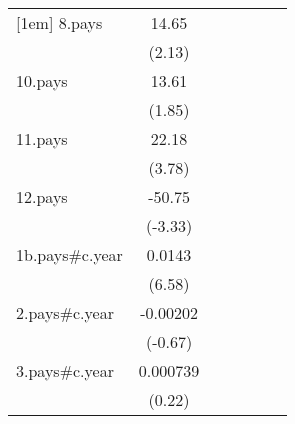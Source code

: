 {\begin{tabular}{l*{6}{c}}
[1em]
8.pays              &       14.65\sym{*}  &                     &                     &                     &                     &                     \\
                    &      (2.13)         &                     &                     &                     &                     &                     \\
[1em]
10.pays             &       13.61         &                     &                     &                     &                     &                     \\
                    &      (1.85)         &                     &                     &                     &                     &                     \\
[1em]
11.pays             &       22.18\sym{***}&                     &                     &                     &                     &                     \\
                    &      (3.78)         &                     &                     &                     &                     &                     \\
[1em]
12.pays             &      -50.75\sym{***}&                     &                     &                     &                     &                     \\
                    &     (-3.33)         &                     &                     &                     &                     &                     \\
[1em]
1b.pays#c.year      &      0.0143\sym{***}&                     &                     &                     &                     &                     \\
                    &      (6.58)         &                     &                     &                     &                     &                     \\
[1em]
2.pays#c.year       &    -0.00202         &                     &                     &                     &                     &                     \\
                    &     (-0.67)         &                     &                     &                     &                     &                     \\
[1em]
3.pays#c.year       &    0.000739         &                     &                     &                     &                     &                     \\
                    &      (0.22)         &                     &                     &                     &                     &                     \\

\end{tabular}}
